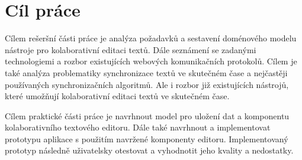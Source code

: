 
\chapter{Cíl práce}\label{ch:cílPráce}

Cílem rešeršní části práce je analýza požadavků a sestavení doménového modelu nástroje pro kolaborativní editaci textů.
Dále seznámení se zadanými technologiemi a rozbor existujících webových komunikačních protokolů.
Cílem je také analýza problematiky synchronizace textů ve skutečném čase a nejčastěji používaných synchronizačních algoritmů.
Ale i rozbor již existujících nástrojů, které umožňují kolaborativní editaci textů ve skutečném čase.




Cílem praktické části práce je navrhnout model pro uložení dat a komponentu kolaborativního textového editoru.
Dále také navrhnout a implementovat prototypu aplikace s použitím navržené komponenty editoru.
Implementovaný prototyp následně uživatelsky otestovat a vyhodnotit jeho kvality a nedostatky.

